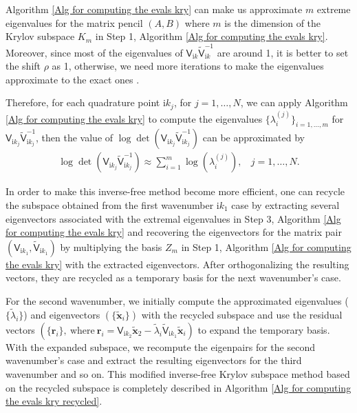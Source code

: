 Algorithm \ref{Alg for computing the evals kry} can make us approximate $m$ extreme eigenvalues for the matrix pencil $(A,B)$ where $m$ is the dimension of the 
Krylov subspace $K_{m}$ in Step 1, Algorithm \ref{Alg for computing the evals kry}. Moreover, since most of the eigenvalues of $\mathsf{V}_{\mathrm{i}k}\tilde{\mathsf{V}}_{\mathrm{i}k}^{-1}$ are around 1,
it is better to set the shift $\rho$ as 1, otherwise, we need more iterations to make the eigenvalues approximate to the exact ones \cite{golub2002inverse}.

Therefore, for each quadrature point $\mathrm{i}k_{j}$, for $j = 1, \dots, N$, we can apply Algorithm \ref{Alg for computing the evals kry} to compute 
the eigenvalues $\{\lambda_{i}^{(j)}\}_{i = 1, \dots, m}$ for $\mathsf{V}_{\mathrm{i}k_{j}}\tilde{\mathsf{V}}_{\mathrm{i}k_{j}}^{-1}$, then the value of 
$\log\det(\mathsf{V}_{\mathrm{i}k_{j}}\tilde{\mathsf{V}}_{\mathrm{i}k_{j}}^{-1})$ can be approximated by 
\begin{align*}
    \log\det(\mathsf{V}_{\mathrm{i}k_{j}}\tilde{\mathsf{V}}_{\mathrm{i}k_{j}}^{-1}) \approx \sum_{i = 1}^{m} \log\left(\lambda_{i}^{(j)}\right), \ \ \ \ j = 1, \dots, N.
\end{align*}

In order to make this inverse-free method become more efficient, one can recycle the subspace obtained from the first wavenumber $\mathrm{i}k_{1}$ case by 
extracting several eigenvectors associated with the extremal eigenvalues in Step 3, Algorithm \ref{Alg for computing the evals kry} and recovering the 
eigenvectors for the matrix pair $(\mathsf{V}_{\mathrm{i}k_{1}}, \tilde{\mathsf{V}}_{\mathrm{i}k_{1}})$ by multiplying the basis $Z_{m}$ in Step 1, 
Algorithm \ref{Alg for computing the evals kry} with the extracted eigenvectors. After orthogonalizing the resulting vectors, they are recycled as a temporary basis
for the next wavenumber's case. 

For the second wavenumber, we initially compute the approximated eigenvalues ($\{\tilde{\lambda}_{i}\}$) and eigenvectors $\left(\{\tilde{\boldsymbol{x}}_{i}\}\right)$ with the 
recycled subspace and use the residual vectors $\left(\{\boldsymbol{r}_{i}\},\ \text{where}\ \boldsymbol{r}_{i} = \mathsf{V}_{\mathrm{i}k_{2}}\tilde{\boldsymbol{x}}_{2} - \tilde{\lambda}_{i}\tilde{\mathsf{V}}_{\mathrm{i}k_{1}}\tilde{\boldsymbol{x}}_{i}\right)$
to expand the temporary basis. With the expanded subspace, we recompute the eigenpairs for the second wavenumber's case and extract the resulting eigenvectors for the 
third wavenumber and so on. This modified inverse-free Krylov subspace method based on the recycled subspace is completely described in 
Algorithm \ref{Alg for computing the evals kry recycled}.

